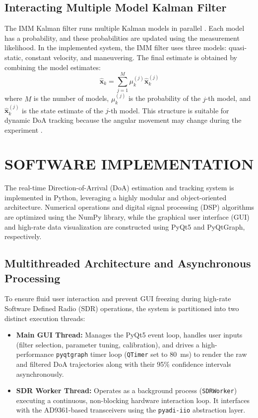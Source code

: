 \documentclass[conference]{IEEEtran}
\begin{document}
\subsection{Interacting Multiple Model Kalman Filter}

The IMM Kalman filter runs multiple Kalman models in parallel \cite{Lim2020IMMPF}. Each model has a probability, and these probabilities are updated using the measurement likelihood. In the implemented system, the IMM filter uses three models: quasi-static, constant velocity, and maneuvering. The final estimate is obtained by combining the model estimates:
\begin{equation}
    \hat{\mathbf{x}}_k = \sum_{j=1}^{M} \mu_k^{(j)} \hat{\mathbf{x}}_k^{(j)}
\end{equation}
where $M$ is the number of models, $\mu_k^{(j)}$ is the probability of the $j$-th model, and $\hat{\mathbf{x}}_k^{(j)}$ is the state estimate of the $j$-th model. This structure is suitable for dynamic DoA tracking because the angular movement may change during the experiment \cite{Hou2023RobustVB-EKF}.

\section{SOFTWARE IMPLEMENTATION}
\label{sec:software_implementation}

The real-time Direction-of-Arrival (DoA) estimation and tracking system is implemented in Python, leveraging a highly modular and object-oriented architecture. Numerical operations and digital signal processing (DSP) algorithms are optimized using the NumPy library, while the graphical user interface (GUI) and high-rate data visualization are constructed using PyQt5 and PyQtGraph, respectively.

\subsection{Multithreaded Architecture and Asynchronous Processing}
To ensure fluid user interaction and prevent GUI freezing during high-rate Software Defined Radio (SDR) operations, the system is partitioned into two distinct execution threads:
\begin{itemize}
    \item \textbf{Main GUI Thread:} Manages the PyQt5 event loop, handles user inputs (filter selection, parameter tuning, calibration), and drives a high-performance \texttt{pyqtgraph} timer loop (\texttt{QTimer} set to 80~ms) to render the raw and filtered DoA trajectories along with their 95\% confidence intervals asynchronously.
    \item \textbf{SDR Worker Thread:} Operates as a background process (\texttt{SDRWorker}) executing a continuous, non-blocking hardware interaction loop. It interfaces with the AD9361-based transceivers using the \texttt{pyadi-iio} abstraction layer.
\end{itemize}
\end{document}
